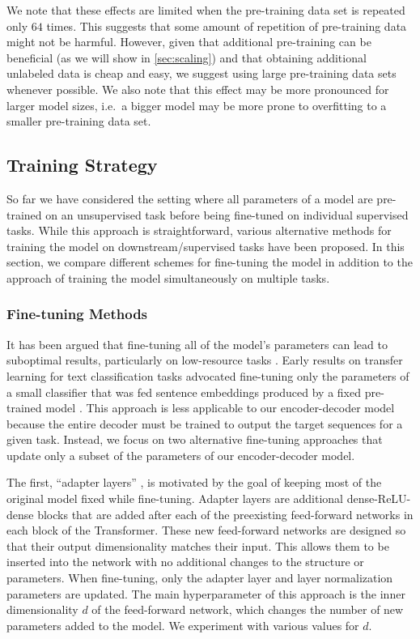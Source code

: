 We note that these effects are limited when the pre-training data set is repeated only $64$ times. This suggests that some amount of repetition of pre-training data might not be harmful. However, given that additional pre-training can be beneficial (as we will show in \ref{sec:scaling}) and that obtaining additional unlabeled data is cheap and easy, we suggest using large pre-training data sets whenever possible. We also note that this effect may be more pronounced for larger model sizes, i.e.\ a bigger model may be more prone to overfitting to a smaller pre-training data set.

\subsection{Training Strategy}
\label{sec:transfer}

So far we have considered the setting where all parameters of a model are pre-trained on an unsupervised task before being fine-tuned on individual supervised tasks. While this approach is straightforward, various alternative methods for training the model on downstream/supervised tasks have been proposed. In this section, we compare different schemes for fine-tuning the model in addition to the approach of training the model simultaneously on multiple tasks.

\subsubsection{Fine-tuning Methods}

It has been argued that fine-tuning all of the model's parameters can lead to suboptimal results, particularly on low-resource tasks \citep{peters2019tune}. Early results on transfer learning for text classification tasks advocated fine-tuning only the parameters of a small classifier that was fed sentence embeddings produced by a fixed pre-trained model \citep{subramanian2018learning,kiros2015skip,logeswaran2018efficient,hill2016learning,conneau2017supervised}. This approach is less applicable to our encoder-decoder model because the entire decoder must be trained to output the target sequences for a given task. Instead, we focus on two alternative fine-tuning approaches that update only a subset of the parameters of our encoder-decoder model.

The first, ``adapter layers'' \citep{houlsby2019parameter,bapna2019simple}, is motivated by the goal of keeping most of the original model fixed while fine-tuning. Adapter layers are additional dense-ReLU-dense blocks that are added after each of the preexisting feed-forward networks in each block of the Transformer. These new feed-forward networks are designed so that their output dimensionality matches their input. This allows them to be inserted into the network with no additional changes to the structure or parameters. When fine-tuning, only the adapter layer and layer normalization parameters are updated. The main hyperparameter of this approach is the inner dimensionality $d$ of the feed-forward network, which changes the number of new parameters added to the model. We experiment with various values for $d$.

